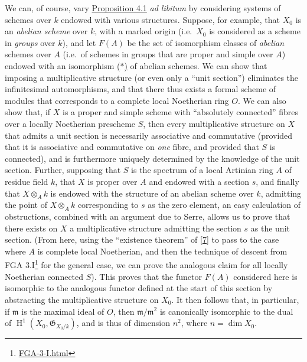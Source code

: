 \documentclass{article}
\renewcommand{\href}[2]{#2\footnote{\url{#1}}}
\newcommand{\oldpage}[1]{\marginpar{\footnotesize$\Big\vert$ \textit{p.~#1}}}
\theoremstyle{definition}
\theoremstyle{definition}
\theoremstyle{definition}
\theoremstyle{definition}
\theoremstyle{remark}
\begin{document}
We can, of course, vary \protect\hyperlink{fga-3-ii-section-C.4-proposition-4}{Proposition 4.1} \emph{ad libitum} by considering systems of schemes over \(k\) endowed with various structures.
Suppose, for example, that \(X_0\) is an \emph{abelian scheme} over \(k\), with a marked origin (i.e.~\(X_0\) is considered as a scheme in \emph{groups} over \(k\)), and let \(F(A)\) be the set of isomorphism classes of \emph{abelian} schemes over \(A\) (i.e.~of schemes in groups that are proper and simple over \(A\)) endowed with an isomorphism \protect\hyperlink{fga-3-ii-section-C.4-equation-asterisk}{(\(*\))} of abelian schemes.
We can show that imposing a multiplicative structure (or even only a ``unit section'') eliminates the infinitesimal automorphisms, and that there thus exists a formal scheme of modules that corresponds to a complete local Noetherian ring \(O\).
We can also show that, if \(X\) is a proper and simple scheme with ``absolutely connected'' fibres over a locally Noetherian prescheme \(S\), then every multiplicative structure on \(X\) that admits a unit section is necessarily associative and commutative (provided that it is associative and commutative on \emph{one} fibre, and provided that \(S\) is connected), and is furthermore uniquely determined by the knowledge of the unit section.
\oldpage{195-19}Further, supposing that \(S\) is the spectrum of a local Artinian ring \(A\) of residue field \(k\), that \(X\) is proper over \(A\) and endowed with a section \(s\), and finally that \(X\otimes_A k\) is endowed with the structure of an abelian scheme over \(k\), admitting the point of \(X\otimes_A k\) corresponding to \(s\) as the zero element, an easy calculation of obstructions, combined with an argument due to Serre, allows us to prove that there exists on \(X\) a multiplicative structure admitting the section \(s\) as the unit section.
(From here, using the ``existence theorem'' of {[}\protect\hyperlink{ref-Gro1958a}{7}{]} to pass to the case where \(A\) is complete local Noetherian, and then the technique of descent from \href{FGA-3-I.html}{FGA 3.I} for the general case, we can prove the analogous claim for all locally Noetherian connected \(S\)).
This proves that the functor \(F(A)\) considered here is isomorphic to the analogous functor defined at the start of this section by abstracting the multiplicative structure on \(X_0\).
It then follows that, in particular, if \({\mathfrak{m}}\) is the maximal ideal of \(O\), then \({\mathfrak{m}}/{\mathfrak{m}}^2\) is canonically isomorphic to the dual of \(\operatorname{H}^1(X_0,{\mathfrak{G}}_{X_0/k})\), and is thus of dimension \(n^2\), where \(n=\dim X_0\).
\end{document}
